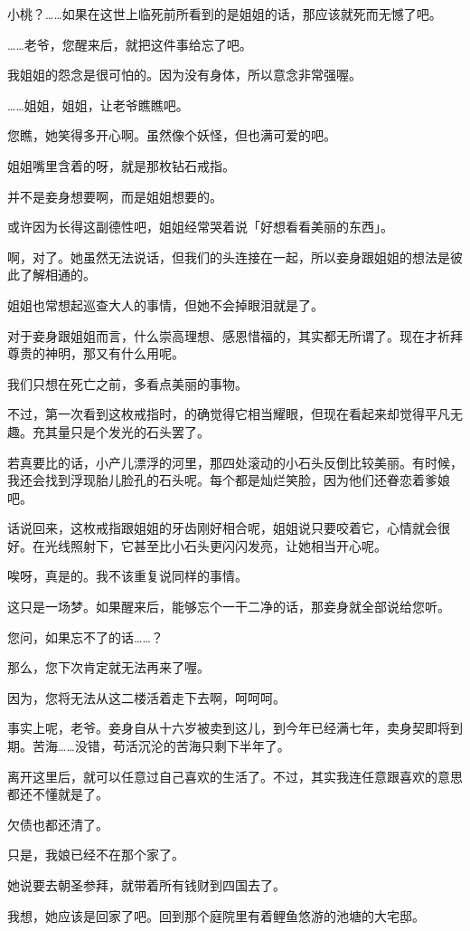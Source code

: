 \documentclass[portrait,a4paper]{article}
\begin{document}
小桃？……如果在这世上临死前所看到的是姐姐的话，那应该就死而无憾了吧。

……老爷，您醒来后，就把这件事给忘了吧。

我姐姐的怨念是很可怕的。因为没有身体，所以意念非常强喔。

……姐姐，姐姐，让老爷瞧瞧吧。

您瞧，她笑得多开心啊。虽然像个妖怪，但也满可爱的吧。

姐姐嘴里含着的呀，就是那枚钻石戒指。

并不是妾身想要啊，而是姐姐想要的。

或许因为长得这副德性吧，姐姐经常哭着说「好想看看美丽的东西」。

啊，对了。她虽然无法说话，但我们的头连接在一起，所以妾身跟姐姐的想法是彼此了解相通的。

姐姐也常想起巡查大人的事情，但她不会掉眼泪就是了。

对于妾身跟姐姐而言，什么崇高理想、感恩惜福的，其实都无所谓了。现在才祈拜尊贵的神明，那又有什么用呢。

我们只想在死亡之前，多看点美丽的事物。

不过，第一次看到这枚戒指时，的确觉得它相当耀眼，但现在看起来却觉得平凡无趣。充其量只是个发光的石头罢了。

若真要比的话，小产儿漂浮的河里，那四处滚动的小石头反倒比较美丽。有时候，我还会找到浮现胎儿脸孔的石头呢。每个都是灿烂笑脸，因为他们还眷恋着爹娘吧。

话说回来，这枚戒指跟姐姐的牙齿刚好相合呢，姐姐说只要咬着它，心情就会很好。在光线照射下，它甚至比小石头更闪闪发亮，让她相当开心呢。

唉呀，真是的。我不该重复说同样的事情。

这只是一场梦。如果醒来后，能够忘个一干二净的话，那妾身就全部说给您听。

您问，如果忘不了的话……？

那么，您下次肯定就无法再来了喔。

因为，您将无法从这二楼活着走下去啊，呵呵呵。

事实上呢，老爷。妾身自从十六岁被卖到这儿，到今年已经满七年，卖身契即将到期。苦海……没错，苟活沉沦的苦海只剩下半年了。

离开这里后，就可以任意过自己喜欢的生活了。不过，其实我连任意跟喜欢的意思都还不懂就是了。

欠债也都还清了。

只是，我娘已经不在那个家了。

她说要去朝圣参拜，就带着所有钱财到四国去了。

我想，她应该是回家了吧。回到那个庭院里有着鲤鱼悠游的池塘的大宅邸。
\end{document}
